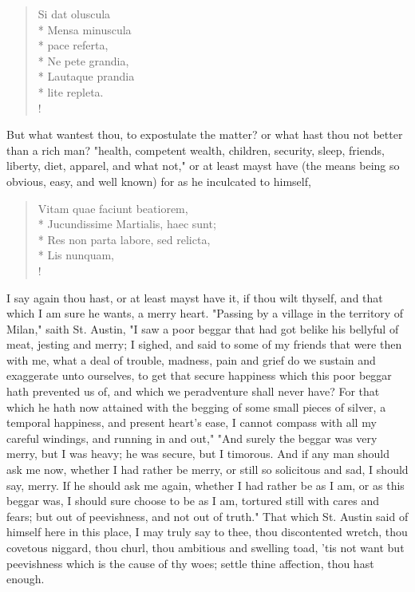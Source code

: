 {\begin{latin}
\begin{verse}%
Si dat oluscula\\*
Mensa minuscula\\*
pace referta,\\*
Ne pete grandia,\\*
Lautaque prandia\\*
lite repleta.\\!
\end{verse}%
\end{latin}

But what wantest thou, to expostulate the matter? or what hast thou not better than a rich man? "health, competent wealth, children, security, sleep, friends, liberty, diet, apparel, and what not," or at least mayst have (the means being so obvious, easy, and well known) for as he inculcated to himself,

\begin{latin}
\begin{verse}%
Vitam quae faciunt beatiorem,\\*
Jucundissime Martialis, haec sunt;\\*
Res non parta labore, sed relicta,\\*
Lis nunquam, \etc{}\\!
\end{verse}%
\end{latin}

I say again thou hast, or at least mayst have it, if thou wilt thyself, and that which I am sure he wants, a merry heart. "Passing by a village in the territory of Milan," saith St. Austin, "I saw a poor beggar that had got belike his bellyful of meat, jesting and merry; I sighed, and said to some of my friends that were then with me, what a deal of trouble, madness, pain and grief do we sustain and exaggerate unto ourselves, to get that secure happiness which this poor beggar hath prevented us of, and which we peradventure shall never have? For that which he hath now attained with the begging of some small pieces of silver, a temporal happiness, and present heart's ease, I cannot compass with all my careful windings, and running in and out," "And surely the beggar was very merry, but I was heavy; he was secure, but I timorous. And if any man should ask me now, whether I had rather be merry, or still so solicitous and sad, I should say, merry. If he should ask me again, whether I had rather be as I am, or as this beggar was, I should sure choose to be as I am, tortured still with cares and fears; but out of peevishness, and not out of truth." That which St. Austin said of himself here in this place, I may truly say to thee, thou discontented wretch, thou covetous niggard, thou churl, thou ambitious and swelling toad, 'tis not want but peevishness which is the cause of thy woes; settle thine affection, thou hast enough.

}
